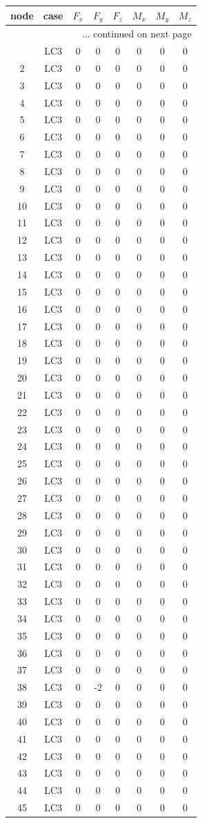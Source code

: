 \documentclass{article}%
\begin{document}
\begin{longtable}{| c c | c c c c c c |}%
\hline%
node&case&$F_x$&$F_y$&$F_z$&$M_x$&$M_y$&$M_z$\\%
\hline%
\endhead%
\hline%
\multicolumn{8}{r}{... continued on next page}\\%
\endfoot%
\hline%
\endlastfoot%
1&LC3&0&0&0&0&0&0\\%
2&LC3&0&0&0&0&0&0\\%
3&LC3&0&0&0&0&0&0\\%
4&LC3&0&0&0&0&0&0\\%
5&LC3&0&0&0&0&0&0\\%
6&LC3&0&0&0&0&0&0\\%
7&LC3&0&0&0&0&0&0\\%
8&LC3&0&0&0&0&0&0\\%
9&LC3&0&0&0&0&0&0\\%
10&LC3&0&0&0&0&0&0\\%
11&LC3&0&0&0&0&0&0\\%
12&LC3&0&0&0&0&0&0\\%
13&LC3&0&0&0&0&0&0\\%
14&LC3&0&0&0&0&0&0\\%
15&LC3&0&0&0&0&0&0\\%
16&LC3&0&0&0&0&0&0\\%
17&LC3&0&0&0&0&0&0\\%
18&LC3&0&0&0&0&0&0\\%
19&LC3&0&0&0&0&0&0\\%
20&LC3&0&0&0&0&0&0\\%
21&LC3&0&0&0&0&0&0\\%
22&LC3&0&0&0&0&0&0\\%
23&LC3&0&0&0&0&0&0\\%
24&LC3&0&0&0&0&0&0\\%
25&LC3&0&0&0&0&0&0\\%
26&LC3&0&0&0&0&0&0\\%
27&LC3&0&0&0&0&0&0\\%
28&LC3&0&0&0&0&0&0\\%
29&LC3&0&0&0&0&0&0\\%
30&LC3&0&0&0&0&0&0\\%
31&LC3&0&0&0&0&0&0\\%
32&LC3&0&0&0&0&0&0\\%
33&LC3&0&0&0&0&0&0\\%
34&LC3&0&0&0&0&0&0\\%
35&LC3&0&0&0&0&0&0\\%
36&LC3&0&0&0&0&0&0\\%
37&LC3&0&0&0&0&0&0\\%
38&LC3&0&{-}2&0&0&0&0\\%
39&LC3&0&0&0&0&0&0\\%
40&LC3&0&0&0&0&0&0\\%
41&LC3&0&0&0&0&0&0\\%
42&LC3&0&0&0&0&0&0\\%
43&LC3&0&0&0&0&0&0\\%
44&LC3&0&0&0&0&0&0\\%
45&LC3&0&0&0&0&0&0\\%
\end{longtable}
\end{document}
